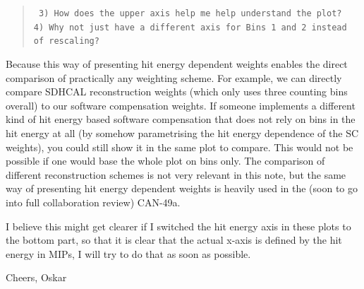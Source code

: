 \documentclass[twoside,a4paper,12pt]{article}
\begin{document}


\begin{quote}\texttt{
3) How does the upper axis help me help understand the plot? \\
4) Why not just have a different axis for Bins 1 and 2 instead of rescaling?}\end{quote}
Because this way of presenting hit energy dependent weights enables the direct comparison of practically any weighting scheme. For example, we can directly compare SDHCAL reconstruction weights (which only uses three counting bins overall) to our software compensation weights. If someone implements a different kind of hit energy based software compensation that does not rely on bins in the hit energy at all (by somehow parametrising the hit energy dependence of the SC weights), you could still show it in the same plot to compare. This would not be possible if one would base the whole plot on bins only. The comparison of different reconstruction schemes is not very relevant in this note, but the same way of presenting hit energy dependent weights is heavily used in the (soon to go into full collaboration review) CAN-49a. 

I believe this might get clearer if I switched the hit energy axis in these plots to the bottom part, so that it is clear that the actual x-axis is defined by the hit energy in MIPs, I will try to do that as soon as possible.

Cheers,
Oskar
\end{document}
